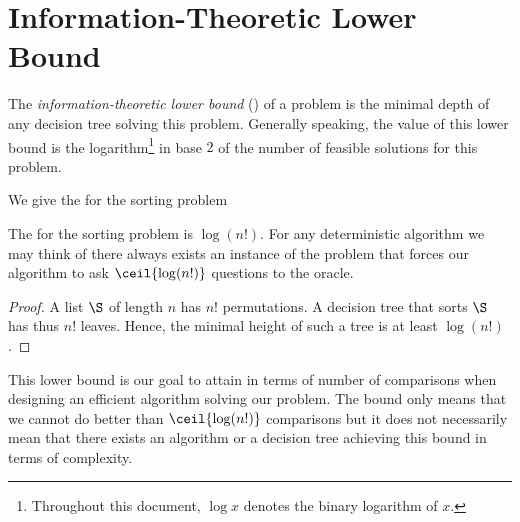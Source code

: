 \section{Information-Theoretic Lower Bound}
\label{tree:sorting:ITLB}

The \emph{information-theoretic lower bound} (\ITLB) of a problem
is the minimal depth of any
decision tree solving this problem. Generally speaking, the value of this lower
bound is the logarithm\footnote{Throughout this document, \(\log x\) denotes the binary logarithm of \(x\).}
in base \(2\) of the number of feasible solutions for this problem.

We give the \ITLB for the sorting problem
\begin{theorem}
The \ITLB for the sorting problem is
\(\log(n!)\). For any deterministic algorithm we may think of
there always exists an instance of the problem that forces our
algorithm to ask \(\ceil{\log(n!)}\) questions to the oracle.
\end{theorem}
\begin{proof}
A list \(\S\) of length \(n\) has \(n!\) permutations. A decision tree that sorts
\(\S\) has thus
\(n!\) leaves. Hence, the minimal height of such a tree is at least \(\log(n!)\).
\end{proof}

This lower bound is our goal to attain in terms of number of comparisons
when designing an efficient algorithm solving our problem. The bound only means
that we cannot do better than \(\ceil{\log(n!)}\) comparisons but it does not
necessarily mean that there exists an algorithm or a decision tree achieving
this bound in terms of complexity.
